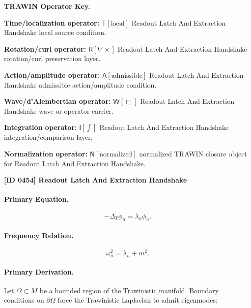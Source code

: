 \par\vspace{0.45\baselineskip}
\noindent\begin{minipage}[t]{\linewidth}
\begingroup
\small
\raggedright
\textbf{TRAWIN Operator Key.}\par
\noindent\textbf{Time/localization operator:} $\mathsf{T}\!\left[\mathrm{local}\right]$ Readout Latch And Extraction Handshake local source condition.\par
\noindent\textbf{Rotation/curl operator:} $\mathsf{R}\!\left[\nabla\times\right]$ Readout Latch And Extraction Handshake rotation/curl preservation layer.\par
\noindent\textbf{Action/amplitude operator:} $\mathsf{A}\!\left[\mathrm{admissible}\right]$ Readout Latch And Extraction Handshake admissible action/amplitude condition.\par
\noindent\textbf{Wave/d'Alembertian operator:} $\mathsf{W}\!\left[\Box\right]$ Readout Latch And Extraction Handshake wave or operator carrier.\par
\noindent\textbf{Integration operator:} $\mathsf{I}\!\left[\int\right]$ Readout Latch And Extraction Handshake integration/comparison layer.\par
\noindent\textbf{Normalization operator:} $\mathsf{N}\!\left[\mathrm{normalized}\right]$ normalized TRAWIN closure object for Readout Latch And Extraction Handshake.\par
\endgroup
\end{minipage}

\clearpage
\noindent\textbf{[ID 0454] Readout Latch And Extraction Handshake}\par
\vspace{0.35em}
\begingroup\small
\paragraph{Primary Equation.}
\begin{equation}
-\Delta_T \phi_n = \lambda_n \phi_n .
\end{equation}

\paragraph{Frequency Relation.}
\begin{equation}
\omega_n^2 = \lambda_n + m^2 .
\end{equation}

\paragraph{Primary Derivation.}
Let $\Omega\subset M$ be a bounded region of the Trawinistic manifold.  
Boundary conditions on $\partial\Omega$ force the Trawinistic Laplacian to admit eigenmodes:

